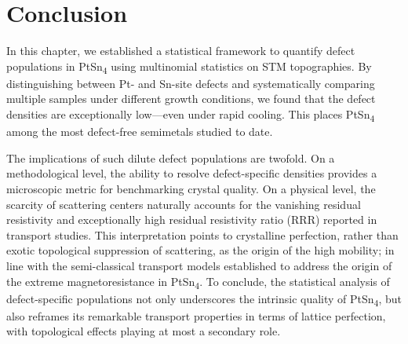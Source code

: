 \section{Conclusion}
In this chapter, we established a statistical framework to quantify defect populations in PtSn\textsubscript{4} using multinomial statistics on STM topographies. By distinguishing between Pt- and Sn-site defects and systematically comparing multiple samples under different growth conditions, we found that the defect densities are exceptionally low—even under rapid cooling. This places PtSn\textsubscript{4} among the most defect-free semimetals studied to date.

The implications of such dilute defect populations are twofold. On a methodological level, the ability to resolve defect-specific densities provides a microscopic metric for benchmarking crystal quality. On a physical level, the scarcity of scattering centers naturally accounts for the vanishing residual resistivity and exceptionally high residual resistivity ratio (RRR) reported in transport studies. This interpretation points to crystalline perfection, rather than exotic topological suppression of scattering, as the origin of the high mobility; in line with the semi-classical transport models established to address the origin of the extreme magnetoresistance in PtSn\textsubscript{4}\cite{diazSemiclassicalOriginExtreme2024}. To conclude, the statistical analysis of defect-specific populations not only underscores the intrinsic quality of PtSn\textsubscript{4}, but also reframes its remarkable transport properties in terms of lattice perfection, with topological effects playing at most a secondary role. 